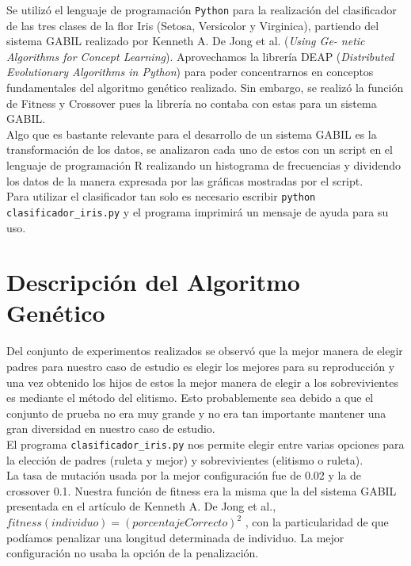\documentclass[a4paper,10pt]{article}
\begin{document}
\indent Se utilizó el lenguaje de programación \verb|Python| para la realización del 
clasificador de las tres clases de la flor Iris (Setosa, Versicolor y Virginica), 
partiendo del sistema GABIL realizado por Kenneth A. De Jong et al. (\emph{Using Ge-
netic Algorithms for Concept Learning}). Aprovechamos la librería DEAP (\emph{Distributed Evolutionary Algorithms in Python})
para poder concentrarnos en conceptos fundamentales del algoritmo genético realizado. Sin embargo, se realizó
la función de Fitness y Crossover pues la librería no contaba con estas para un sistema GABIL.\\
\indent Algo que es bastante relevante para el desarrollo de un sistema GABIL es la transformación de 
los datos, se analizaron cada uno de estos con un script en el lenguaje de programación R
realizando un histograma de frecuencias y dividendo los datos de la manera expresada
por las gráficas mostradas por el script.\\
\indent Para utilizar el clasificador tan solo es necesario escribir \verb|python| \\ \verb|clasificador_iris.py| y 
el programa imprimirá un mensaje de ayuda para su uso.

\section{Descripción del Algoritmo Genético}

\indent Del conjunto de experimentos realizados se observó que la mejor manera de elegir
padres para nuestro caso de estudio es elegir los mejores para su reproducción y una vez
obtenido los hijos de estos la mejor manera de elegir a los sobrevivientes es mediante el
método del elitismo. Esto probablemente sea debido a que el conjunto de prueba no era 
muy grande y no era tan importante mantener una gran diversidad en nuestro caso de estudio.\\
\indent El programa \verb|clasificador_iris.py| nos permite elegir entre varias opciones 
para la elección de padres (ruleta y mejor) y sobrevivientes (elitismo o ruleta).\\
\indent La tasa de mutación usada por la mejor configuración fue de 0.02 y la de 
crossover 0.1. Nuestra función de fitness era la misma que la del sistema GABIL presentada
en el artículo de Kenneth A. De Jong et al., $fitness(individuo) = (porcentajeCorrecto)^2$ , 
con la particularidad de que podíamos penalizar una longitud determinada de individuo. La mejor
configuración no usaba la opción de la penalización.
\end{document}

